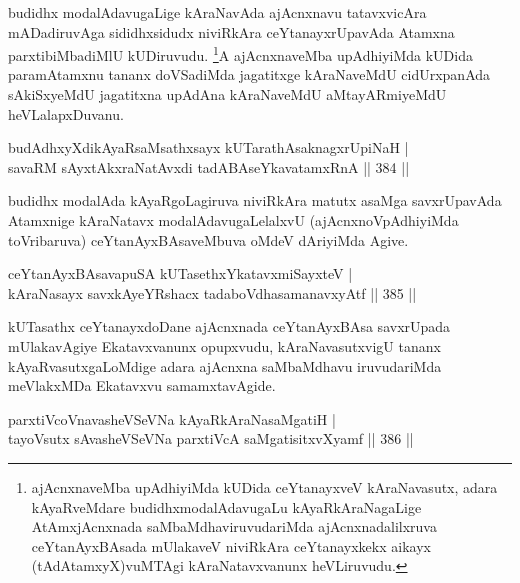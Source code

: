 \begin{artha}
budidhx modalAdavugaLige kAraNavAda ajAcnxnavu tatavxvicAra mADadiruvAga sididhxsidudx niviRkAra ceYtanayxrUpavAda Atamxna parxtibiMbadiMlU kUDiruvudu. \footnote{ajAcnxnaveMba upAdhiyiMda kUDida ceYtanayxveV kAraNavasutx, adara kAyaRveMdare budidhxmodalA\-davugaLu kAyaRkAraNagaLige AtAmxjAcnxnada saMbaMdhaviruvudariMda ajAcnxnadalilxruva ceYtanAyxBAsada mUlakaveV niviRkAra ceYtanayxkekx aikayx (tAdAtamxyX)vuMTAgi kAraNatavxvanunx heVLiruvudu.}A ajAcnxnaveMba upAdhiyiMda kUDida paramAtamxnu tananx doVSadiMda jagatitxge kAraNaveMdU cidUrxpanAda sAkiSxyeMdU jagatitxna upAdAna kAraNaveMdU aMtayARmiyeMdU heVLalapxDuvanu.
\end{artha}

\begin{shl}
budAdhxyXdikAyaRsaMsathxsayx kUTarathAsaknagxrUpiNaH | \\
savaRM sAyxtAkxraNatAvxdi tadABAseYkavatamxRnA \hfill||  384 ||  
\end{shl}

\begin{artha}
budidhx modalAda kAyaRgoLagiruva niviRkAra matutx asaMga savxrUpavAda Atamxnige kAraNatavx modalAdavugaLelalxvU (ajAcnxnoVpAdhiyiMda toVribaruva) ceYtanAyxBAsaveMbuva oMdeV dAriyiMda Agive.
\end{artha}


\begin{shl}
ceYtanAyxBAsavapuSA kUTasethxYkatavxmiSayxteV | \\
kAraNasayx savxkAyeYRshacx tadaboVdhasamanavxyAtf \hfill||  385 ||  
\end{shl}

\begin{artha}
kUTasathx ceYtanayxdoDane ajAcnxnada ceYtanAyxBAsa savxrUpada mUlakavAgiye Ekatavxvanunx opupxvudu, kAraNavasutxvigU tananx kAyaRvasutxgaLoMdige adara ajAcnxna saMbaMdhavu iruvudariMda meVlakxMDa Ekatavxvu samamxtavAgide.
\end{artha}

\begin{shl}
parxtiVcoV\s navasheVSeVNa kAyaRkAraNasaMgatiH | \\
tayoVsutx sAvasheVSeVNa parxtiVcA saMgatisitxvXyamf \hfill||  386 ||  
\end{shl}

